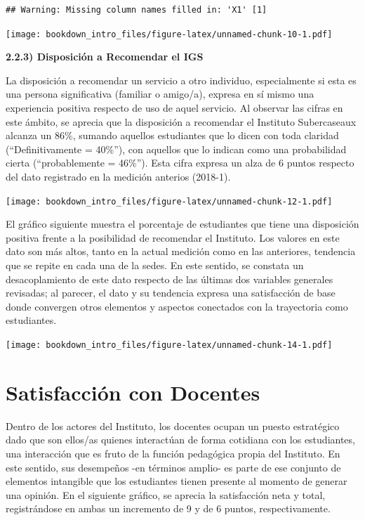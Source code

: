 \documentclass[]{book}
\begin{document}
\begin{verbatim}
## Warning: Missing column names filled in: 'X1' [1]
\end{verbatim}

\texttt{[image: bookdown\_intro\_files/figure-latex/unnamed-chunk-10-1.pdf]}

\textbf{2.2.3) Disposición a Recomendar el IGS}

La disposición a recomendar un servicio a otro individuo, especialmente
si esta es una persona significativa (familiar o amigo/a), expresa en sí
mismo una experiencia positiva respecto de uso de aquel servicio. Al
observar las cifras en este ámbito, se aprecia que la disposición a
recomendar el Instituto Subercaseaux alcanza un 86\%, sumando aquellos
estudiantes que lo dicen con toda claridad (``Definitivamente = 40\%''),
con aquellos que lo indican como una probabilidad cierta
(``probablemente = 46\%''). Esta cifra expresa un alza de 6 puntos
respecto del dato registrado en la medición anterios (2018-1).

\texttt{[image: bookdown\_intro\_files/figure-latex/unnamed-chunk-12-1.pdf]}

El gráfico siguiente muestra el porcentaje de estudiantes que tiene una
disposición positiva frente a la posibilidad de recomendar el Instituto.
Los valores en este dato son más altos, tanto en la actual medición como
en las anteriores, tendencia que se repite en cada una de la sedes. En
este sentido, se constata un desacoplamiento de este dato respecto de
las últimas dos variables generales revisadas; al parecer, el dato y su
tendencia expresa una satisfacción de base donde convergen otros
elementos y aspectos conectados con la trayectoria como estudiantes.

\texttt{[image: bookdown\_intro\_files/figure-latex/unnamed-chunk-14-1.pdf]}

\section{Satisfacción con Docentes}\label{satisfaccion-con-docentes}

Dentro de los actores del Instituto, los docentes ocupan un puesto
estratégico dado que son ellos/as quienes interactúan de forma cotidiana
con los estudiantes, una interacción que es fruto de la función
pedagógica propia del Instituto. En este sentido, sus desempeños -en
términos amplio- es parte de ese conjunto de elementos intangible que
los estudiantes tienen presente al momento de generar una opinión. En el
siguiente gráfico, se aprecia la satisfacción neta y total,
registrándose en ambas un incremento de 9 y de 6 puntos,
respectivamente.
\end{document}
